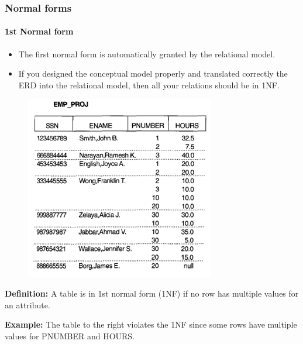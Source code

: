\documentclass{beamer}
\begin{document}
\begin{frame}
	\frametitle{Normal forms}
	\framesubtitle{1st Normal form}
	
	\begin{itemize}
		\item The first normal form is automatically granted by the relational model.
		\item If you designed the conceptual model properly and translated correctly the ERD into the relational model, then all your relations should be in 1NF.
	\end{itemize}
	
	\begin{figure}
		\begin{center}
			\includegraphics[scale=0.4]{img/normalization/norm7}
		\end{center}
	\end{figure}
	
	\textbf{Definition:}
	A table is in 1st normal form (1NF) if no row has multiple values for an attribute.
	
	\textbf{Example:} The table to the right violates the 1NF since some rows have multiple values for PNUMBER and HOURS.
\end{frame}
\end{document}
